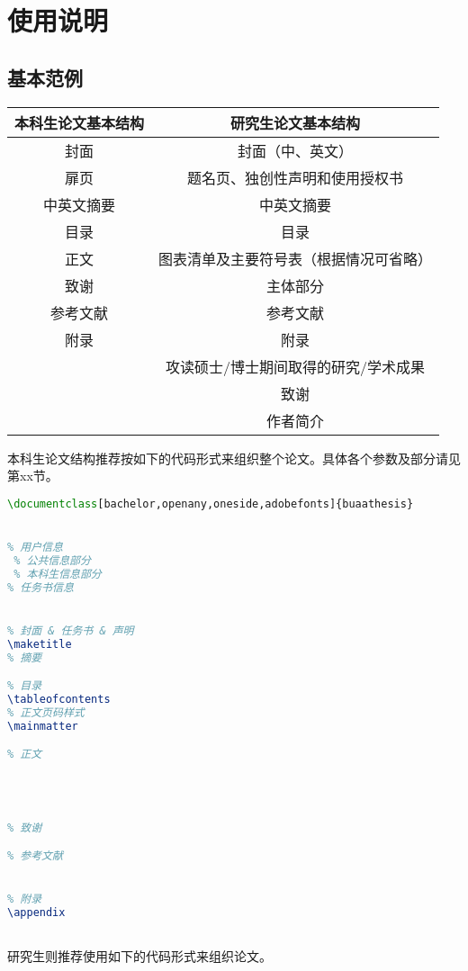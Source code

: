 \chapter{使用说明}
\section{基本范例}
\begin{table}
\begin{center}
    \begin{tabular}{|c|c|}
    \hline
    本科生论文基本结构 & 研究生论文基本结构\\\hline\hline
    封面 & 封面（中、英文）\\
    扉页 & 题名页、独创性声明和使用授权书\\
    中英文摘要 & 中英文摘要\\
    目录 & 目录\\
    正文 & 图表清单及主要符号表（根据情况可省略）\\
    致谢 & 主体部分\\
    参考文献 & 参考文献\\
    附录 & 附录\\
    ~~ & 攻读硕士/博士期间取得的研究\slash 学术成果\\
    ~~ & 致谢\\
    ~~ & 作者简介\\
    \hline
    \end{tabular}
\end{center}
\end{table}
\qquad 本科生论文结构推荐按如下的代码形式来组织整个论文。具体各个参数及部分请见第xx节。

\begin{lstlisting}[language={LaTeX}]
% !Mode:: "TeX:UTF-8"
\documentclass[bachelor,openany,oneside,adobefonts]{buaathesis}


% 用户信息
 % 公共信息部分
 % 本科生信息部分
% 任务书信息


% 封面 & 任务书 & 声明
\maketitle
% 摘要

% 目录
\tableofcontents
% 正文页码样式
\mainmatter

% 正文




% 致谢

% 参考文献


% 附录
\appendix



\end{lstlisting}
\qquad 研究生则推荐使用如下的代码形式来组织论文。

